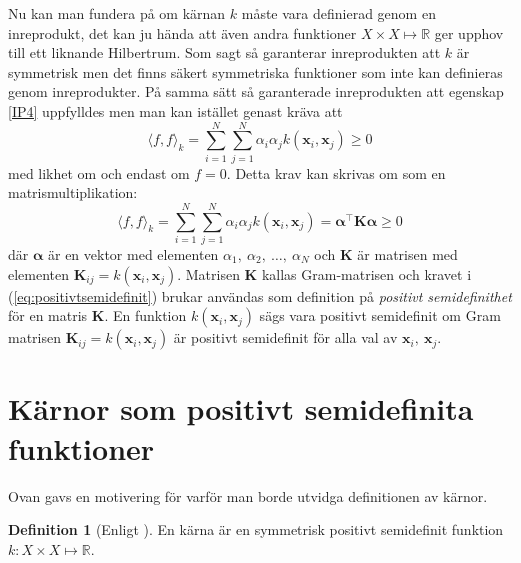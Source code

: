 \documentclass[a4paper, 12pt]{report}
\theoremstyle{definition}
\newtheorem{defi}{Definition}[section]
\theoremstyle{remark}
\newcommand{\bfx}{\mathbf{x}}
\begin{document}
Nu kan man fundera på om kärnan $k$ måste vara definierad genom en inreprodukt, det kan ju hända att även andra funktioner $X \times X \longmapsto \mathbb{R}$ ger upphov till ett liknande Hilbertrum. Som sagt så garanterar inreprodukten att $k$ är symmetrisk men det finns säkert symmetriska funktioner som inte kan definieras genom inreprodukter. På samma sätt så garanterade inreprodukten att egenskap \ref{IP4} uppfylldes men man kan istället genast kräva att
\begin{equation*}
	\langle f, f \rangle_k = \sum_{i=1}^{N}\sum_{j=1}^{N}\alpha_i\alpha_jk\left(\bfx_i, \bfx_j\right) \geq 0
\end{equation*}
med likhet om och endast om $f=0$. Detta krav kan skrivas om som en matrismultiplikation:
\begin{equation}\label{eq:positivtsemidefinit}
\langle f, f \rangle_k = \sum_{i=1}^{N}\sum_{j=1}^{N}\alpha_i\alpha_jk\left(\bfx_i, \bfx_j\right) = \boldsymbol{\alpha}^\intercal \mathbf{K} \boldsymbol{\alpha}\geq 0
\end{equation}
där $\boldsymbol{\alpha}$ är en vektor med elementen $\alpha_1,~\alpha_2,~\dots,~\alpha_N$ och $\mathbf{K}$ är matrisen med elementen $\mathbf{K}_{ij}=k\left(\bfx_i, \bfx_j\right)$. Matrisen $\mathbf{K}$ kallas Gram-matrisen och kravet i (\ref{eq:positivtsemidefinit}) brukar användas som definition på \emph{positivt semidefinithet} för en matris $\mathbf{K}$. En funktion $k\left(\bfx_i, \bfx_j\right)$ sägs vara positivt semidefinit om Gram matrisen $\mathbf{K}_{ij}=k\left(\bfx_i, \bfx_j\right)$ är positivt semidefinit för alla val av $\bfx_i,~\bfx_j$.
\newpage
\section{Kärnor som positivt semidefinita funktioner}

Ovan gavs en motivering för varför man borde utvidga definitionen av kärnor.
\begin{defi}[Enligt \cite{LearningKernels}]
	En kärna är en symmetrisk positivt semidefinit funktion $k: X \times X \longmapsto \mathbb{R}$.
\end{defi}
\end{document}
